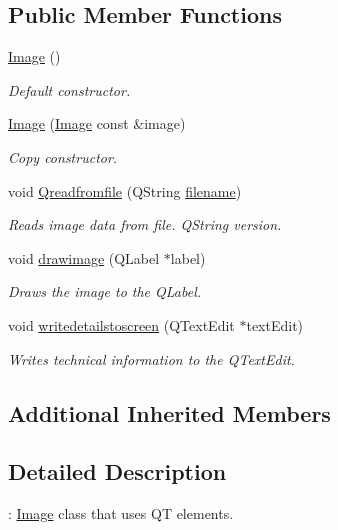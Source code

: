 \subsection*{Public Member Functions}
\begin{DoxyCompactItemize}
\item 
\hyperlink{classImage_a58edd1c45b4faeb5f789b0d036d02313}{Image} ()\hypertarget{classImage_a58edd1c45b4faeb5f789b0d036d02313}{}\label{classImage_a58edd1c45b4faeb5f789b0d036d02313}

\begin{DoxyCompactList}\small\item\em Default constructor. \end{DoxyCompactList}\item 
\hyperlink{classImage_ada9ac359edb381345fd859b01ada4614}{Image} (\hyperlink{classImage}{Image} const \&image)
\begin{DoxyCompactList}\small\item\em Copy constructor. \end{DoxyCompactList}\item 
void \hyperlink{classImage_a27afd52aa98fe782e4af180dee15d32b}{Qreadfromfile} (Q\+String \hyperlink{classImage__cuda__compatible_a5dbc3fe00b4ca74f9a3868849cb24406}{filename})
\begin{DoxyCompactList}\small\item\em Reads image data from file. Q\+String version. \end{DoxyCompactList}\item 
void \hyperlink{classImage_a306e9ddde48e5bc079cf22676f9ff7d4}{drawimage} (Q\+Label $\ast$label)
\begin{DoxyCompactList}\small\item\em Draws the image to the Q\+Label. \end{DoxyCompactList}\item 
void \hyperlink{classImage_adfb17986907ce55fba5bbc53fa01d686}{writedetailstoscreen} (Q\+Text\+Edit $\ast$text\+Edit)
\begin{DoxyCompactList}\small\item\em Writes technical information to the Q\+Text\+Edit. \end{DoxyCompactList}\end{DoxyCompactItemize}
\subsection*{Additional Inherited Members}


\subsection{Detailed Description}
\+: \hyperlink{classImage}{Image} class that uses QT elements. 

